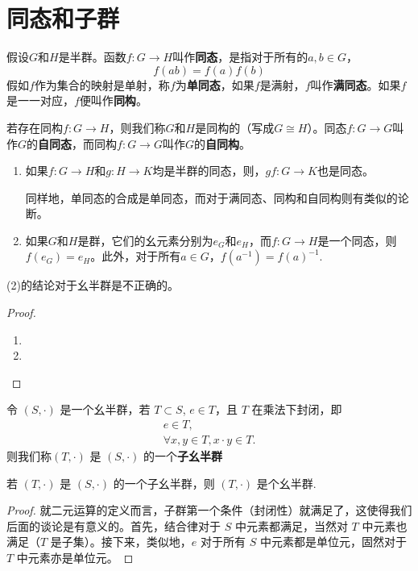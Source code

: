 \documentclass[../../main.tex]{subfiles}
\begin{document}
\section{同态和子群}

\begin{definition}[同态]
假设$G$和$H$是半群。函数$f: G \to H$叫作\textbf{同态}，是指对于所有的$a, b \in G$，
\[f(ab) = f(a)f(b)\]
假如$f$作为集合的映射是单射，称$f$为\textbf{单同态}，如果$f$是满射，$f$叫作\textbf{满同态}。如果$f$是一一对应，$f$便叫作\textbf{同构}。

若存在同构$f: G \to H$，则我们称$G$和$H$是同构的（写成$G \cong H$）。同态$f: G \to G$叫作$G$的\textbf{自同态}，而同构$f: G \to G$叫作$G$的\textbf{自同构}。
\end{definition}

\begin{theorem}
\begin{enumerate}[(1)]
\item 如果$f: G \to H$和$g: H \to K$均是半群的同态，则，$gf: G \to K$也是同态。

同样地，单同态的合成是单同态，而对于满同态、同构和自同构则有类似的论断。

\item 如果$G$和$H$是群，它们的幺元素分别为$e_G$和$e_H$，而$f: G \to H$是一个同态，则$f(e_G) = e_H$。此外，对于所有$a \in G$，$f(a^{-1}) = f(a)^{-1}$.
\end{enumerate}
\end{theorem}
\begin{remark}
(2)的结论对于幺半群是不正确的。
\end{remark}
\begin{proof}
\begin{enumerate}
\item 

\item 
\end{enumerate}
\end{proof}


\begin{definition}[子幺半群]
令 $(S, \cdot)$ 是一个幺半群，若 $T \subset S$, $e \in T$，且 $T$ 在乘法下封闭，即
\begin{gather*}
e \in T ,\\
\forall x, y \in T, x \cdot y\in T .
\end{gather*}
则我们称$(T, \cdot)$ 是 $(S, \cdot)$ 的一个\textbf{子幺半群}
\end{definition}

\begin{proposition}[子幺半群也是幺半群]
若 $(T, \cdot)$ 是 $(S, \cdot)$ 的一个子幺半群，则 $(T, \cdot)$ 是个幺半群.
\end{proposition}
\begin{proof}
就二元运算的定义而言，子群第一个条件（封闭性）就满足了，这使得我们后面的谈论是有意义的。首先，结合律对于 $S$ 中元素都满足，当然对 $T$ 中元素也满足（$T$ 是子集）。接下来，类似地，$e$ 对于所有 $S$ 中元素都是单位元，固然对于 $T$ 中元素亦是单位元。 
\end{proof}
\end{document}
